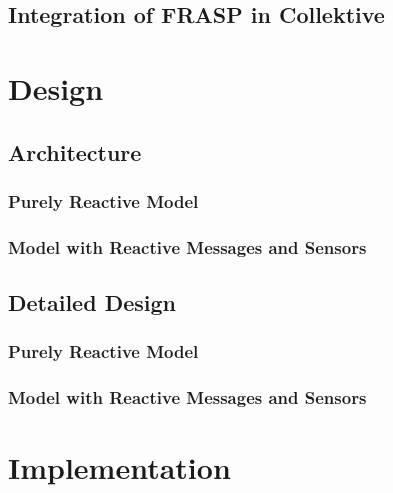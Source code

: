 \documentclass[12pt,a4paper,openright,twoside]{book}
\begin{document}

\section{Integration of FRASP in Collektive}

\chapter{Design}
\label{chap:design}

\section{Architecture}

\subsection{Purely Reactive Model}

\subsection{Model with Reactive Messages and Sensors}

\section{Detailed Design}

\subsection{Purely Reactive Model}

\subsection{Model with Reactive Messages and Sensors}

\chapter{Implementation}
\label{chap:implementation}
\end{document}

